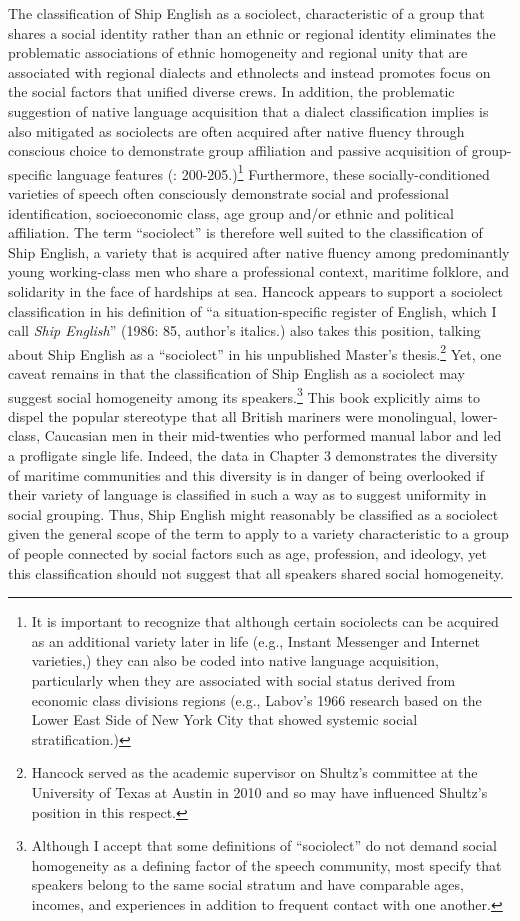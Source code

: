 The classification of Ship English as a sociolect, characteristic of a group that shares a social identity rather than an ethnic or regional identity \citep[122]{Trudgill2003} eliminates the problematic associations of ethnic homogeneity and regional unity that are associated with regional dialects and ethnolects and instead promotes focus on the social factors that unified diverse crews. In addition, the problematic suggestion of native language acquisition that a dialect classification implies is also mitigated as sociolects are often acquired after native fluency through conscious choice to demonstrate group affiliation and passive acquisition of group-specific language features (\citealt{Durrell2004}: 200-205.)\footnote{It is important to recognize that although certain sociolects can be acquired as an additional variety later in life (e.g., Instant Messenger and Internet varieties,) they can also be coded into native language acquisition, particularly when they are associated with social status derived from economic class divisions regions (e.g., Labov’s 1966 research based on the Lower East Side of New York City that showed systemic social stratification.)}  Furthermore, these socially-conditioned varieties of speech often consciously demonstrate social and professional identification, socioeconomic class, age group and/or ethnic and political affiliation. The term “sociolect” is therefore well suited to the classification of Ship English, a variety that is acquired after native fluency among predominantly young working-class men who share a professional context, maritime folklore, and solidarity in the face of hardships at sea. Hancock appears to support a sociolect classification in his definition of “a situation-specific register of English, which I call \textit{Ship English}” (1986: 85, author’s italics.) \citet{Schultz2010} also takes this position, talking about Ship English as a “sociolect” in his unpublished Master’s thesis.\footnote{Hancock served as the academic supervisor on Shultz’s committee at the University of Texas at Austin in 2010 and so may have influenced Shultz’s position in this respect.}  Yet, one caveat remains in that the classification of Ship English as a sociolect may suggest social homogeneity among its speakers.\footnote{Although I accept that some definitions of “sociolect” do not demand social homogeneity as a defining factor of the speech community, most specify that speakers belong to the same social stratum and have comparable ages, incomes, and experiences in addition to frequent contact with one another.}  This book explicitly aims to dispel the popular stereotype that all British mariners were monolingual, lower-class, Caucasian men in their mid-twenties who performed manual labor and led a profligate single life. Indeed, the data in Chapter 3 demonstrates the diversity of maritime communities and this diversity is in danger of being overlooked if their variety of language is classified in such a way as to suggest uniformity in social grouping. Thus, Ship English might reasonably be classified as a sociolect given the general scope of the term to apply to a variety characteristic to a group of people connected by social factors such as age, profession, and ideology, yet this classification should not suggest that all speakers shared social homogeneity. 

